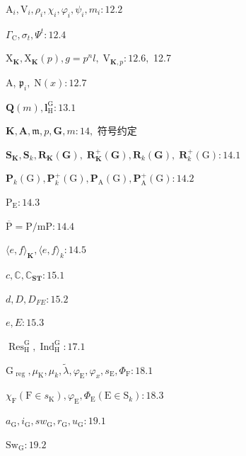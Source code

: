 \documentclass[10pt]{article}
\begin{document}
\({\mathrm{A}}_{i},{\mathrm{V}}_{i},{\rho }_{i},{\chi }_{i},{\varphi }_{i},{\psi }_{i},{m}_{i} : {12.2}\)

\({\Gamma }_{\mathrm{C}},{\sigma }_{t},{\Psi }^{t} : {12.4}\)

\({\mathrm{X}}_{\mathbf{K}},{\mathrm{X}}_{\mathbf{K}}\left( p\right) ,g = {p}^{n}l,{\mathrm{\;V}}_{\mathbf{K},p} : {12.6},\) 12.7

A, \({\mathfrak{p}}_{i},\mathrm{\;N}\left( x\right)  : {12.7}\)

\(\mathbf{Q}\left( m\right) ,{\mathbf{l}}_{\mathrm{H}}^{\mathrm{G}} : {13.1}\)

\(\mathbf{K},\mathbf{A},\mathfrak{m},p,\mathbf{G},m : {14},\) 符号约定

\({\mathbf{S}}_{\mathbf{K}},{\mathbf{S}}_{k},{\mathbf{R}}_{\mathbf{K}}\left( \mathbf{G}\right) ,\;{\mathbf{R}}_{\mathbf{K}}^{ + }\left( \mathbf{G}\right) ,{\mathbf{R}}_{k}\left( \mathbf{G}\right) , \; {\mathbf{R}}_{k}^{ + }\left( \mathrm{G}\right)  : {14.1}\)

\({\mathbf{P}}_{k}\left( \mathrm{G}\right) ,{\mathbf{P}}_{k}^{ + }\left( \mathrm{G}\right) ,{\mathbf{P}}_{\mathrm{A}}\left( \mathrm{G}\right) ,{\mathbf{P}}_{\mathrm{A}}^{ + }\left( \mathrm{G}\right)  : {14.2}\)

\({\mathrm{P}}_{\mathrm{E}} : {14.3}\)

\(\overline{\mathrm{P}} = \mathrm{P}/\mathrm{{mP}} : {14.4}\)

\(\langle e,f{\rangle }_{\mathbf{K}},\langle e,f{\rangle }_{k} : {14.5}\)

\(c,\mathbb{C},{\mathbb{C}}_{\mathbf{{ST}}} : {15.1}\)

\(d,D,{D}_{FE} : {15.2}\)

\(e,E : {15.3}\)

\({\operatorname{Res}}_{\mathrm{H}}^{\mathrm{G}},{\operatorname{Ind}}_{\mathrm{H}}^{\mathrm{G}} : {17.1}\)

\({\mathrm{G}}_{\text{ reg }},{\mu }_{\mathrm{K}},{\mu }_{k},\widetilde{\lambda },{\varphi }_{\mathrm{E}},{\varphi }_{x},{s}_{\mathrm{E}},{\Phi }_{\mathrm{F}} : {18.1}\)

\({\chi }_{\mathrm{F}}\left( {\mathrm{F} \in  {s}_{\mathrm{K}}}\right) ,{\varphi }_{\mathrm{E}},{\Phi }_{\mathrm{E}}\left( {\mathrm{E} \in  {\mathrm{S}}_{k}}\right)  : {18.3}\)

\({a}_{\mathrm{G}},{i}_{\mathrm{G}},s{w}_{\mathrm{G}},{r}_{\mathrm{G}},{u}_{\mathrm{G}} : {19.1}\)

\({\mathrm{{Sw}}}_{\mathrm{G}} : {19.2}\)
\end{document}
